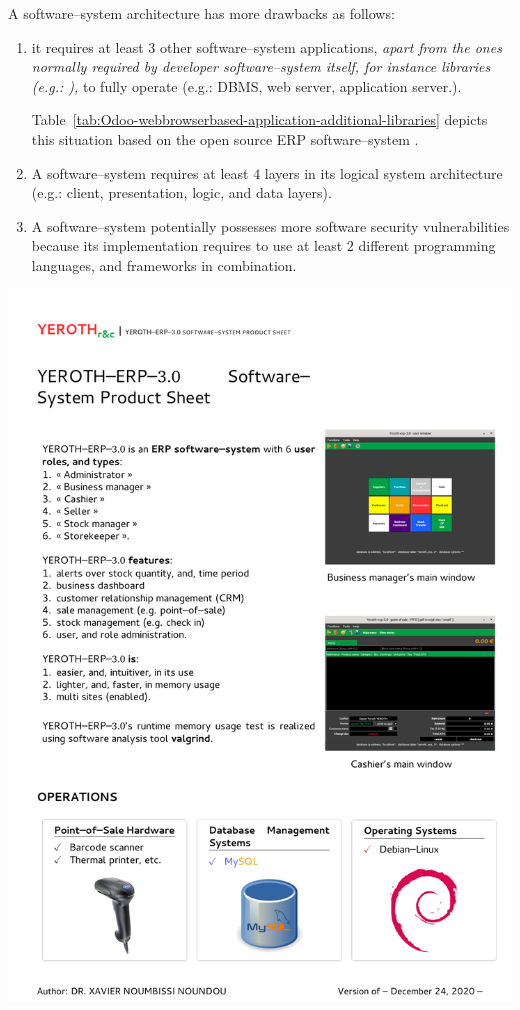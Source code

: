 A \webbrowserbased software--system
architecture has more drawbacks as
follows:

\begin{enumerate}[1.]
	\item it requires at least $3$ other 
		software--system applications, \emph{apart from
		the ones normally required by developer
		software--system itself, for instance libraries (e.g.:
		\logFourJ),} to fully operate
		(e.g.: DBMS, web server, application server.).
		
		Table~\ref{tab:Odoo-webbrowserbased-application-additional-libraries}
		depicts this situation based on the open source ERP
		software--system \Odoo.		
				
	\item A \webbrowserbased software--system
		requires at least $4$ layers in
		its logical system architecture
		(e.g.: client, presentation, logic,
		and data layers).

	\item A \webbrowserbased software--system
		potentially possesses more software
		security vulnerabilities because its
		implementation requires to use at least
		$2$ different programming languages, and
		frameworks in combination.
\end{enumerate}

\newpage

\includegraphics[scale=0.93]{../yeroth-product-sheet/yeroth-erp-3-0-product-sheet.pdf}

